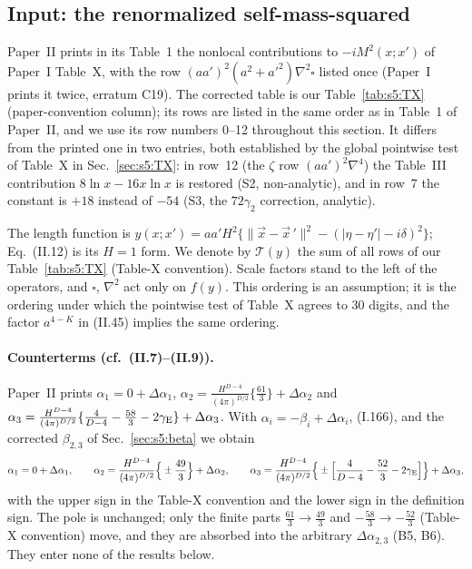 \documentclass[aps,prd,onecolumn,10pt,nofootinbib,floatfix]{revtex4-2}
\newcommand{\PI}{Paper~I}
\newcommand{\PII}{Paper~II}
\newcommand{\eqI}[1]{(I.#1)}
\newcommand{\eqII}[1]{(II.#1)}
\newcommand{\Tab}{\mathcal{T}}
\begin{document}
\subsection{Input: the renormalized self-mass-squared}
\label{sec:s6:input}

\PII{} prints in its Table~1 the nonlocal contributions to $-iM^2(x;x')$ of \PI{} Table~X, with the row
$(aa')^2(a^2+a'^2)\nabla^2\square$ listed once (\PI{} prints it twice, erratum C19). The corrected table is our Table~\ref{tab:s5:TX}
(paper-convention column); its rows are listed in the same order as in Table~1 of \PII,
and we use its row numbers 0--12 throughout this section. It differs from the printed one in two entries, both
established by the global pointwise test of Table~X in Sec.~\ref{sec:s5:TX}: in row~12 (the $\zeta$ row
$(aa')^2\nabla^4$) the Table~III contribution $8\ln x-16x\ln x$ is restored (S2, non-analytic), and in row~7 the constant
is $+18$ instead of $-54$ (S3, the $72\gamma_2$ correction, analytic).

The length function is $y(x;x')=aa'H^2\{\|\vec x-\vec x\,'\|^2-(|\eta-\eta'|-i\delta)^2\}$; Eq.~\eqII{12} is its
$H=1$ form. We denote by $\Tab(y)$ the sum of all rows of our Table~\ref{tab:s5:TX} (Table-X convention). Scale factors
stand to the left of the operators, and $\square$, $\nabla^2$ act only on $f(y)$. This ordering is an assumption;
it is the ordering under which the pointwise test of Table~X agrees to 30 digits, and the factor $a^{4-K}$ in \eqII{45}
implies the same ordering.

\paragraph*{Counterterms (cf.\ \eqII{7}--\eqII{9}).}
\PII{} prints $\alpha_1=0+\Delta\alpha_1$,
$\alpha_2=\frac{H^{D-4}}{(4\pi)^{D/2}}\{\frac{61}{3}\}+\Delta\alpha_2$ and
$\alpha_3=\frac{H^{D-4}}{(4\pi)^{D/2}}\{\frac4{D-4}-\frac{58}3-2\gamma_{\rm E}\}+\Delta\alpha_3$.
With $\alpha_i=-\beta_i+\Delta\alpha_i$, \eqI{166}, and the corrected $\beta_{2,3}$ of Sec.~\ref{sec:s5:beta} we obtain
\begin{equation}
\alpha_1=0+\Delta\alpha_1,\qquad
\alpha_2=\frac{H^{D-4}}{(4\pi)^{D/2}}\Big\{\pm\frac{49}{3}\Big\}+\Delta\alpha_2,\qquad
\alpha_3=\frac{H^{D-4}}{(4\pi)^{D/2}}\Big\{\pm\Big[\frac{4}{D-4}-\frac{52}{3}-2\gamma_{\rm E}\Big]\Big\}+\Delta\alpha_3,
\label{eq:s6:alpha}
\end{equation}
with the upper sign in the Table-X convention and the lower sign in the definition sign. The pole is unchanged; only the
finite parts $\frac{61}3\to\frac{49}3$ and $-\frac{58}3\to-\frac{52}3$ (Table-X convention) move, and they are absorbed into
the arbitrary $\Delta\alpha_{2,3}$ (B5, B6). They enter none of the results below.
\end{document}
